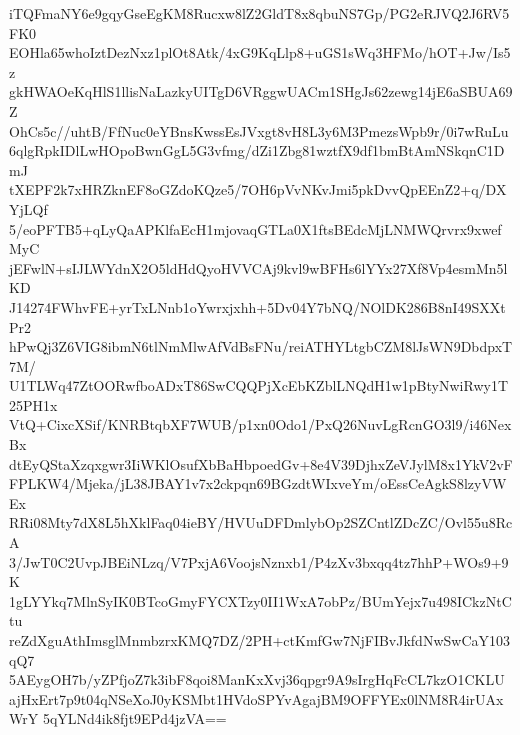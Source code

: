 iTQFmaNY6e9gqyGseEgKM8Rucxw8lZ2GldT8x8qbuNS7Gp/PG2eRJVQ2J6RV5FK0
EOHla65whoIztDezNxz1plOt8Atk/4xG9KqLlp8+uGS1sWq3HFMo/hOT+Jw/Is5z
gkHWAOeKqHlS1llisNaLazkyUITgD6VRggwUACm1SHgJs62zewg14jE6aSBUA69Z
OhCs5c//uhtB/FfNuc0eYBnsKwssEsJVxgt8vH8L3y6M3PmezsWpb9r/0i7wRuLu
6qlgRpkIDlLwHOpoBwnGgL5G3vfmg/dZi1Zbg81wztfX9df1bmBtAmNSkqnC1DmJ
tXEPF2k7xHRZknEF8oGZdoKQze5/7OH6pVvNKvJmi5pkDvvQpEEnZ2+q/DXYjLQf
5/eoPFTB5+qLyQaAPKlfaEcH1mjovaqGTLa0X1ftsBEdcMjLNMWQrvrx9xwefMyC
jEFwlN+sIJLWYdnX2O5ldHdQyoHVVCAj9kvl9wBFHs6lYYx27Xf8Vp4esmMn5lKD
J14274FWhvFE+yrTxLNnb1oYwrxjxhh+5Dv04Y7bNQ/NOlDK286B8nI49SXXtPr2
hPwQj3Z6VIG8ibmN6tlNmMlwAfVdBsFNu/reiATHYLtgbCZM8lJsWN9DbdpxT7M/
U1TLWq47ZtOORwfboADxT86SwCQQPjXcEbKZblLNQdH1w1pBtyNwiRwy1T25PH1x
VtQ+CixcXSif/KNRBtqbXF7WUB/p1xn0Odo1/PxQ26NuvLgRcnGO3l9/i46NexBx
dtEyQStaXzqxgwr3IiWKlOsufXbBaHbpoedGv+8e4V39DjhxZeVJylM8x1YkV2vF
FPLKW4/Mjeka/jL38JBAY1v7x2ckpqn69BGzdtWIxveYm/oEssCeAgkS8lzyVWEx
RRi08Mty7dX8L5hXklFaq04ieBY/HVUuDFDmlybOp2SZCntlZDcZC/Ovl55u8RcA
3/JwT0C2UvpJBEiNLzq/V7PxjA6VoojsNznxb1/P4zXv3bxqq4tz7hhP+WOs9+9K
1gLYYkq7MlnSyIK0BTcoGmyFYCXTzy0II1WxA7obPz/BUmYejx7u498ICkzNtCtu
reZdXguAthImsglMnmbzrxKMQ7DZ/2PH+ctKmfGw7NjFIBvJkfdNwSwCaY103qQ7
5AEygOH7b/yZPfjoZ7k3ibF8qoi8ManKxXvj36qpgr9A9sIrgHqFcCL7kzO1CKLU
ajHxErt7p9t04qNSeXoJ0yKSMbt1HVdoSPYvAgajBM9OFFYEx0lNM8R4irUAxWrY
5qYLNd4ik8fjt9EPd4jzVA==
